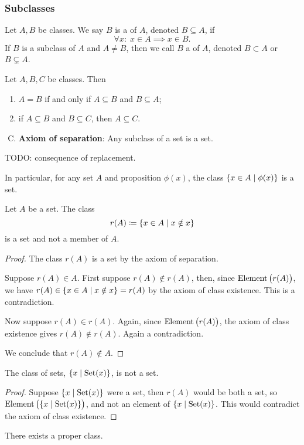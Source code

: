 \subsubsection{Subclasses}
\begin{definition}
Let $A,B$ be classes. We say $B$ is a  of $A$, denoted $B\subseteq A$, if
\[ \forall x: \; x\in A \implies x\in B. \]
If $B$ is a subclass of $A$ and $A \neq B$, then we call $B$ a  of $A$, denoted $B \subset A$ or $B \subsetneq A$.
\end{definition}

\begin{lemma}
Let $A,B,C$ be classes. Then
\begin{enumerate}
\item $A = B$ \textup{if and only if} $A \subseteq B$ and $B \subseteq A$;
\item if $A \subseteq B$ and $B\subseteq C$, then $A \subseteq C$.
\end{enumerate}
\end{lemma}

\begin{enumerate}[(A)] \setcounter{enumi}{2}
\item \textbf{Axiom of separation}: Any subclass of a set is a set.
\end{enumerate}
TODO: consequence of replacement.

In particular, for any set $A$ and proposition $\phi(x)$, the class $\setbuilder{x\in A}{\phi(x)}$ is a set.

\begin{proposition} \label{russellParadox}
Let $A$ be a set. The class
\[ r(A) \defeq \setbuilder{x\in A}{ x\notin x } \]
is a set and not a member of $A$.
\end{proposition}
\begin{proof}
The class $r(A)$ is a set by the axiom of separation.

Suppose $r(A)\in A$. First suppose $r(A)\notin r(A)$, then, since $\operatorname{Element}\big(r(A)\big)$, we have $r(A)\in \setbuilder{x\in A}{ x\notin x } = r(A)$ by the axiom of class existence. This is a contradiction.

Now suppose $r(A)\in r(A)$. Again, since $\operatorname{Element}\big(r(A)\big)$, the axiom of class existence gives $r(A)\notin r(A)$. Again a contradiction.

We conclude that $r(A)\notin A$.
\end{proof}
\begin{corollary} \label{setOfSets}
The class of sets, $\setbuilder{x}{\Set(x)}$, is not a set.
\end{corollary}
\begin{proof}
Suppose $\setbuilder{x}{\Set(x)}$ were a set, then $r(A)$ would be both a set, so $\Element\big(\setbuilder{x}{\Set(x)}\big)$, and not an element of $\setbuilder{x}{\Set(x)}$. This would contradict the axiom of class existence.
\end{proof}
\begin{corollary} \label{properClassExistence}
There exists a proper class.
\end{corollary}

